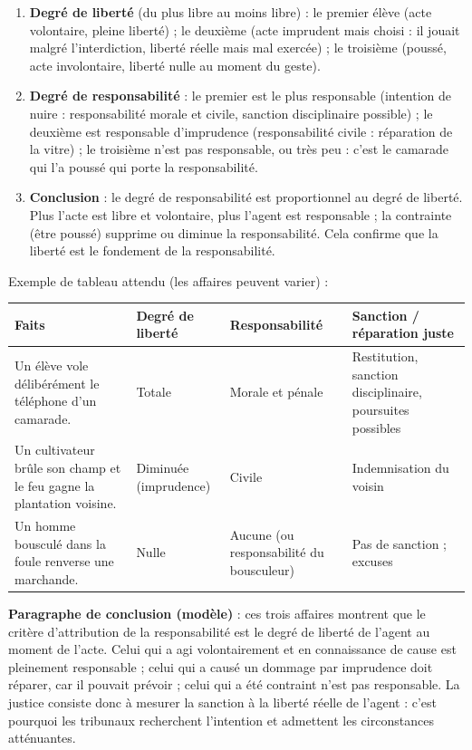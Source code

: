 \documentclass[11pt]{article}
\begin{document}
\begin{corrige}
\begin{enumerate}
\item \textbf{Degré de liberté} (du plus libre au moins libre) : le premier élève (acte volontaire, pleine liberté) ; le deuxième (acte imprudent mais choisi : il jouait malgré l'interdiction, liberté réelle mais mal exercée) ; le troisième (poussé, acte involontaire, liberté nulle au moment du geste).
\item \textbf{Degré de responsabilité} : le premier est le plus responsable (intention de nuire : responsabilité morale et civile, sanction disciplinaire possible) ; le deuxième est responsable d'imprudence (responsabilité civile : réparation de la vitre) ; le troisième n'est pas responsable, ou très peu : c'est le camarade qui l'a poussé qui porte la responsabilité.
\item \textbf{Conclusion} : le degré de responsabilité est proportionnel au degré de liberté. Plus l'acte est libre et volontaire, plus l'agent est responsable ; la contrainte (être poussé) supprime ou diminue la responsabilité. Cela confirme que la liberté est le fondement de la responsabilité.
\end{enumerate}
\end{corrige}

\begin{corrige}
Exemple de tableau attendu (les affaires peuvent varier) :
\begin{center}
\begin{tabularx}{\linewidth}{|X|l|l|X|}
\hline
\rowcolor{popblueL} \textbf{Faits} & \textbf{Degré de liberté} & \textbf{Responsabilité} & \textbf{Sanction / réparation juste} \\
\hline
Un élève vole délibérément le téléphone d'un camarade. & Totale & Morale et pénale & Restitution, sanction disciplinaire, poursuites possibles \\
\hline
Un cultivateur brûle son champ et le feu gagne la plantation voisine. & Diminuée (imprudence) & Civile & Indemnisation du voisin \\
\hline
Un homme bousculé dans la foule renverse une marchande. & Nulle & Aucune (ou responsabilité du bousculeur) & Pas de sanction ; excuses \\
\hline
\end{tabularx}
\end{center}
\textbf{Paragraphe de conclusion (modèle)} : ces trois affaires montrent que le critère d'attribution de la responsabilité est le degré de liberté de l'agent au moment de l'acte. Celui qui a agi volontairement et en connaissance de cause est pleinement responsable ; celui qui a causé un dommage par imprudence doit réparer, car il pouvait prévoir ; celui qui a été contraint n'est pas responsable. La justice consiste donc à mesurer la sanction à la liberté réelle de l'agent : c'est pourquoi les tribunaux recherchent l'intention et admettent les circonstances atténuantes.
\end{corrige}
\end{document}

